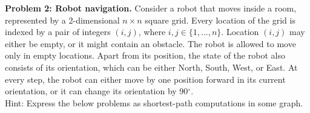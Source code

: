 \documentclass[11pt]{article}
\begin{document}

\textbf{Problem 2: Robot navigation.} Consider a robot that moves inside a room,
represented by a 2-dimensional $n\times n$ square grid. Every location of the grid is indexed by a pair of integers $(i, j)$, where $i, j \in \{1,...,n\}$. Location $(i, j)$
may either be empty, or it might contain an obstacle. The robot is allowed to move only
in empty locations. Apart from its position, the state of the robot also consists of
its orientation, which can be either North, South, West, or East. At every step, the
robot can either move by one position forward in its current orientation, or it
can change its orientation by 90$^{\circ}$. \\
Hint: Express the below problems as shortest-path computations in some graph.
\end{document}
